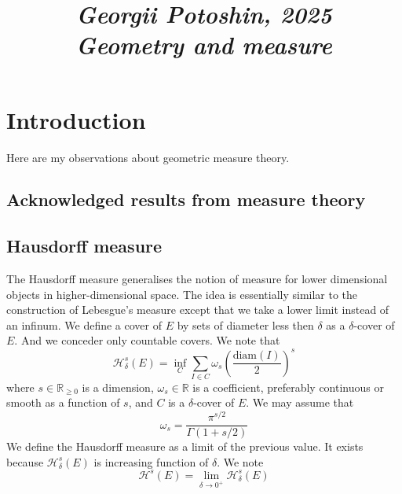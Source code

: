 \documentclass{article}
\begin{document}
\title{
\textit{\small{Georgii Potoshin, 2025}}\\
\vspace{0.3ex}
\textit{\huge{Geometry and measure}}\vspace{1ex}
}
\date{\vspace{-5ex}}
\maketitle


\date{\vspace{-10ex}}

\maketitle

\section{Introduction}
Here are my observations about geometric measure theory.

\subsection{Acknowledged results from measure theory}

\subsection{Hausdorff measure}
The Hausdorff measure generalises the notion of measure for lower dimensional
objects in higher-dimensional space. The idea is essentially similar to the
construction of Lebesgue's measure except that we take a lower limit instead of
an infinum. We define a cover of $E$ by sets of diameter less then $\delta$ as
a $\delta$-cover of $E$. And we conceder only countable covers. We note that
\[\mathcal{H}_\delta^s(E)=\inf_{C}\sum_{I\in C}\omega_s\left(\frac{\text{diam}(I)}{2}\right)^s\]
where $s\in\mathbb{R}_{\geq 0}$ is a dimension, $\omega_s\in\mathbb{R}$ is a
coefficient, preferably continuous or smooth as a function of $s$, and $C$ is a
$\delta$-cover of $E$. We may assume that
\[\omega_s = \frac{\pi^{s/2}}{\Gamma(1+s/2)}\]
We define the Hausdorff measure as a limit of the previous value. It exists
because $\mathcal{H}_\delta^s(E)$ is increasing function of $\delta$. We note
\[\mathcal{H}^s(E)=\lim_{\delta\rightarrow0^+}\mathcal{H}^s_\delta(E)\]
\end{document}
